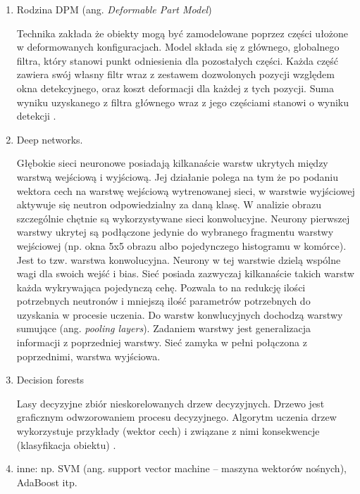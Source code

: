\begin{enumerate}
\item Rodzina DPM (ang. \textit{Deformable Part Model}) 

Technika zakłada że obiekty mogą być zamodelowane poprzez części ułożone w deformowanych konfiguracjach. Model składa się z głównego, globalnego filtra, który stanowi punkt odniesienia dla pozostałych części. Każda część zawiera swój własny filtr wraz z zestawem dozwolonych pozycji względem okna detekcyjnego, oraz koszt deformacji dla każdej z tych pozycji. Suma wyniku uzyskanego z filtra głównego wraz z jego częściami stanowi o wyniku detekcji \cite{felzenszwalb2008discriminatively}.

\item Deep networks.

Głębokie sieci neuronowe posiadają kilkanaście warstw ukrytych między warstwą wejściową i wyjściową. Jej działanie polega na tym że po podaniu wektora cech na warstwę wejściową wytrenowanej sieci, w warstwie wyjściowej aktywuje się neutron odpowiedzialny za daną klasę. W analizie obrazu szczególnie chętnie są wykorzystywane sieci konwolucyjne. Neurony pierwszej warstwy ukrytej są podłączone jedynie do wybranego fragmentu warstwy wejściowej (np. okna 5x5 obrazu albo pojedynczego histogramu w komórce). Jest to tzw. warstwa konwolucyjna. Neurony w tej warstwie dzielą wspólne wagi dla swoich wejść i bias. Sieć posiada zazwyczaj kilkanaście takich warstw każda wykrywająca pojedynczą cehę. Pozwala to na redukcję ilości potrzebnych neutronów i mniejszą ilość parametrów potrzebnych do uzyskania w procesie uczenia. Do warstw konwlucyjnych dochodzą warstwy sumujące (ang. \textit{pooling layers}). Zadaniem warstwy jest generalizacja informacji z poprzedniej warstwy. Sieć zamyka w pełni połączona z poprzednimi, warstwa wyjściowa.

\item Decision forests 

 Lasy decyzyjne zbiór nieskorelowanych drzew decyzyjnych. Drzewo jest graficznym odwzorowaniem procesu decyzyjnego. Algorytm uczenia drzew wykorzystuje przykłady (wektor cech) i związane z nimi konsekwencje (klasyfikacja obiektu) . 

\item inne:  np. SVM (ang. support vector machine – maszyna wektorów nośnych), AdaBoost itp. 


\end{enumerate}





